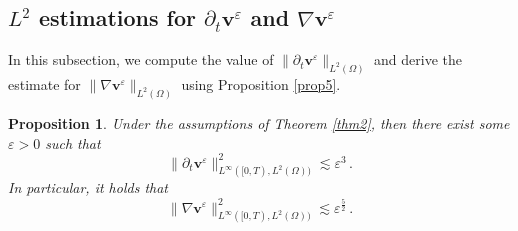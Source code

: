 \documentclass[pdflatex,sn-mathphys-num]{sn-jnl}%
\theoremstyle{thmstyleone}%
\newtheorem{proposition}[theorem]{Proposition}%
\theoremstyle{thmstyletwo}%
\theoremstyle{thmstylethree}%
\theoremstyle{thmstyletwo}
\begin{document}
\subsection{{$L^2$ estimations for $\partial_t \boldsymbol{v}^\varepsilon$ and $\nabla \boldsymbol{v}^\varepsilon$}}\label{sub4.2}






In this subsection, we compute the value of $\lVert\partial_t\boldsymbol v^{\varepsilon}\rVert_{{L}^2(\Omega)}$
and derive the estimate for $\lVert\nabla\boldsymbol v^{\varepsilon}\rVert_{{L}^2(\Omega)}$
using Proposition \ref{prop5}.
\begin{proposition}\label{prop8}
	Under the assumptions of Theorem \ref{thm2}, then there exist some $\varepsilon>0$ such that
	\begin{equation}\label{4.1.1}
		\lVert\partial_t\boldsymbol v^{\varepsilon}\rVert^2_{L^\infty([0,T),{L}^2(\Omega))}
		\lesssim\varepsilon^3\,.
	\end{equation}
	In particular, it holds that
	\begin{equation}\label{4.2.1}
		\lVert\nabla\boldsymbol v^{\varepsilon}\rVert^2_{L^\infty([0,T),{L}^2(\Omega))}
		\lesssim\varepsilon^{\frac52}\,.
	\end{equation}
\end{proposition}
\end{document}
